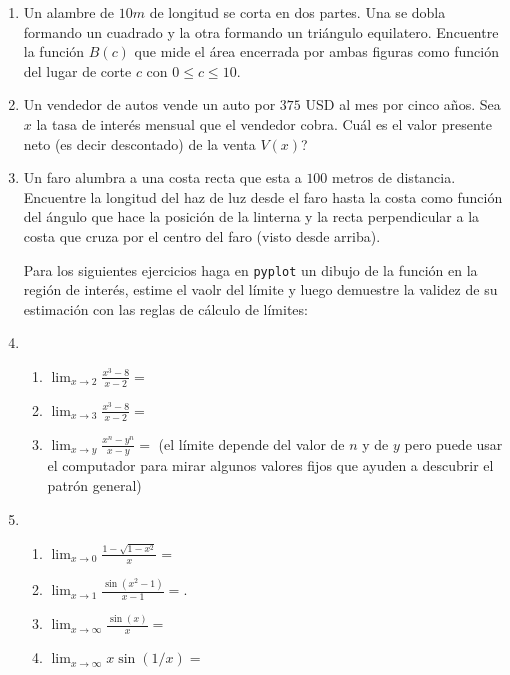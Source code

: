 \documentclass[12pt, a4paper]{article}
\begin{document}
\begin{enumerate}
\item Un alambre de $10m$ de longitud se corta en dos partes. Una se dobla formando un cuadrado y la otra formando un triángulo equilatero. Encuentre la función $B(c)$ que mide el área encerrada por ambas figuras como función del lugar de corte $c$ con $0\leq c\leq 10$.

\item Un vendedor de autos vende un auto por $375$ USD al mes por cinco a\~nos. Sea $x$ la tasa de interés mensual que el vendedor cobra. Cuál es el valor presente neto (es decir descontado) de la venta $V(x)$? 

\item Un faro alumbra a una costa recta que esta a $100$ metros de distancia. Encuentre la longitud del haz de luz desde el faro hasta la costa como función del ángulo que hace la posición de la linterna y la recta perpendicular a la costa que cruza por el centro del faro (visto desde arriba).

 Para los siguientes ejercicios haga en \verb!pyplot! un dibujo de la función en la región de interés, estime el vaolr del límite y luego demuestre la validez de su estimación con las reglas de cálculo de límites:


\item 
\begin{enumerate}
\item $\lim_{x\rightarrow 2} \frac{x^3-8}{x-2}=$
\item $\lim_{x\rightarrow 3}\frac{x^3-8}{x-2}=$
\item $\lim_{x\rightarrow y} \frac{x^n-y^n}{x-y}=$ (el límite depende del valor de $n$ y de $y$ pero puede usar el computador para mirar algunos valores fijos que ayuden a descubrir el patrón general) 
\end{enumerate}

\item 
\begin{enumerate}
\item $\lim_{x\rightarrow 0} \frac{1-\sqrt{1-x^2}}{x}=$
\item $\lim_{x\rightarrow 1} \frac{\sin(x^2-1)}{x-1}=$.
\item $\lim_{x\rightarrow \infty} \frac{\sin(x)}{x}=$

\item $\lim_{x\rightarrow \infty} x\sin(1/x)=$
\end{enumerate}

\end{enumerate}
\end{document}
